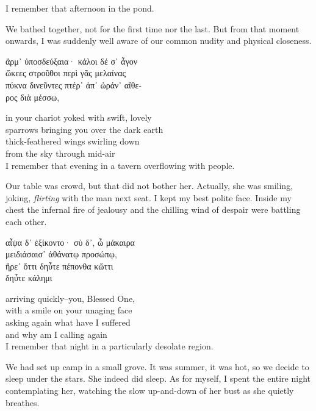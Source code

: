 \documentclass{report}
\begin{document}
I remember that afternoon in the pond.

We bathed together, not for the first time nor the last. But from that moment onwards, I was suddenly well aware of our common nudity and physical closeness.\\

\begin{otherlanguage}{greek}
ἄρμ᾽ ὐποσδεύξαια· κάλοι δέ σ᾽ ἆγον\\
ὤκεες στροῦθοι περὶ γᾶς μελαίνας\\
πύκνα δινεῦντες πτέρ᾽ ἀπ᾽ ὠράν᾽ αἴθε-\\
ρος διὰ μέσσω,
\end{otherlanguage}

in your chariot yoked with swift, lovely\\
sparrows bringing you over the dark earth\\
thick-feathered wings swirling down\\
from the sky through mid-air
\\

I remember that evening in a tavern overflowing with people.

Our table was crowd, but that did not bother her. Actually, she was smiling, joking, \emph{flirting} with the man next seat. I kept my best polite face. Inside my chest the infernal fire of jealousy and the chilling wind of despair were battling each other.\\

\begin{otherlanguage}{greek}
αἶψα δ᾽ ἐξίκοντο· σὺ δ᾽, ὦ μάκαιρα\\
μειδιάσαισ᾽ ἀθάνατῳ προσώπῳ,\\
ἤρε᾽ ὄττι δηὖτε πέπονθα κὤττι\\
δηὖτε κάλημι
\end{otherlanguage}

arriving quickly--you, Blessed One,\\
with a smile on your unaging face\\
asking again what have I suffered\\
and why am I calling again
\\

I remember that night in a particularly desolate region.

We had set up camp in a small grove. It was summer, it was hot, so we decide to sleep under the stars. She indeed did sleep. As for myself, I spent the entire night contemplating her, watching the slow up-and-down of her bust as she quietly breathes.\\
\end{document}
